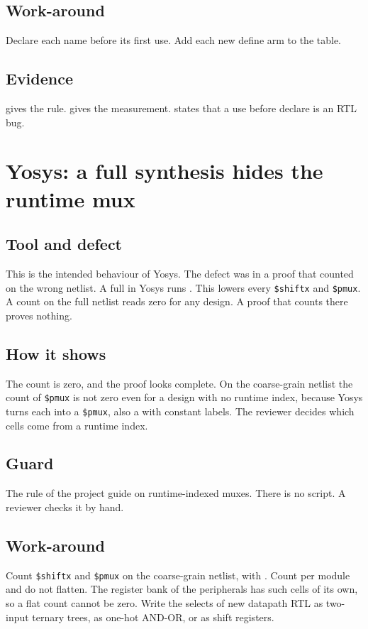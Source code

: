\subsection*{Work-around}
Declare each name before its first use. Add each new define arm to the  table.

\subsection*{Evidence}
 gives the rule.  gives the measurement.  states that a use before declare is an RTL bug.

\section{Yosys: a full synthesis hides the runtime mux}\label{tm:defect:yosys-hides-runtime-mux}
\subsection*{Tool and defect}
This is the intended behaviour of Yosys. The defect was in a proof that counted on the wrong netlist. A full  in Yosys runs . This lowers every \texttt{\$shiftx} and \texttt{\$pmux}. A count on the full netlist reads zero for any design. A proof that counts there proves nothing.

\subsection*{How it shows}
The count is zero, and the proof looks complete. On the coarse-grain netlist the count of \texttt{\$pmux} is not zero even for a design with no runtime index, because Yosys turns each  into a \texttt{\$pmux}, also a  with constant labels. The reviewer decides which cells come from a runtime index.

\subsection*{Guard}
The rule of the project guide on runtime-indexed muxes. There is no script. A reviewer checks it by hand.

\subsection*{Work-around}
Count \texttt{\$shiftx} and \texttt{\$pmux} on the coarse-grain netlist, with . Count per module and do not flatten. The register bank of the peripherals has such cells of its own, so a flat count cannot be zero. Write the selects of new datapath RTL as two-input ternary trees, as one-hot AND-OR, or as shift registers.

